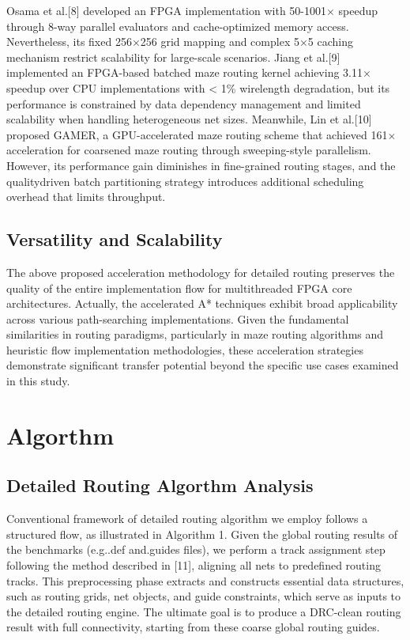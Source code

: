 \documentclass[conference]{IEEEtran}
\begin{document}
Osama et al.[8] developed an FPGA implementation with 50-1001$\times$ speedup through 8-way parallel evaluators and cache-optimized memory access. 
Nevertheless, its fixed 256$\times$256 grid mapping and complex 5$\times$5 caching mechanism restrict scalability for large-scale scenarios. 
Jiang et al.[9] implemented an FPGA-based batched maze routing kernel achieving 3.11$\times$ speedup over CPU implementations with < 1\% 
wirelength degradation, but its performance is constrained by data dependency management and limited scalability when handling heterogeneous net sizes. 
Meanwhile, Lin et al.[10] proposed GAMER, a GPU-accelerated maze routing scheme that achieved 161$\times$ acceleration for coarsened maze routing through sweeping-style parallelism. 
However, its performance gain diminishes in fine-grained routing stages, and the qualitydriven batch partitioning strategy introduces 
additional scheduling overhead that limits throughput. 

\subsection{Versatility and Scalability}
The above proposed acceleration methodology for detailed routing preserves the quality of the entire implementation flow for 
multithreaded FPGA core architectures. Actually, the accelerated A* techniques exhibit broad applicability across various path-searching 
implementations. Given the fundamental similarities in routing paradigms,  particularly in maze routing algorithms and heuristic flow implementation 
methodologies, these acceleration strategies demonstrate significant transfer potential beyond the specific use cases examined in this study. 





\section{Algorthm}
\subsection{Detailed Routing Algorthm Analysis}
Conventional framework of detailed routing algorithm we employ follows a structured flow, as illustrated in Algorithm 1. 
Given the global routing results of the benchmarks (e.g..def and.guides files), we perform a track assignment step following the method described in [11], aligning all nets to predefined routing tracks. 
This preprocessing phase extracts and constructs essential data structures, such as routing grids, net objects, and guide constraints, which serve as inputs to the detailed routing engine. 
The ultimate goal is to produce a DRC-clean routing result with full connectivity, starting from these coarse global routing guides.
\end{document}
